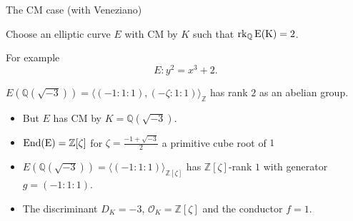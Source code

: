 \documentclass[12pt]{beamer}
\newcommand{\qe}{\mathbb{Q}}
\begin{document}
\begin{frame}{The CM case (with Veneziano)}
\begin{alertblock} {Choose an elliptic curve $E$  with CM by $K$ such that $\rm{rk}_\mathbb{Q} \, E({K})=2$.  }\end{alertblock}

 For example  $$E : y^2=x^3+2.$$ 
   
 \pause
  
  \begin{alertblock} {$E(\qe(\sqrt{-3}))=\langle (-1:1:1),(-\zeta:1:1)\rangle_{\mathbb{Z}}$ has rank $2$ as an abelian group. }\end{alertblock}
  
  
  
 \pause
 

    \begin{itemize} \item But $E$ has CM by $K=\qe(\sqrt{-3})$.
    \item  $\rm{End}
    (E)=\mathbb{Z}[\zeta]$ for $\zeta=\frac{-1+\sqrt{-3}}{2}$ a primitive cube root of $1$ 
    
    \item $E(\qe(\sqrt{-3}))=\langle (-1:1:1)\rangle_{\mathbb{Z}[\zeta]}$ has $\mathbb{Z}[\zeta]$-rank $1$ with generator  $g=(-1:1:1)$.
    



   \item   The  discriminant $D_K=-3$,  $\mathcal{O}_K=\mathbb{Z}[\zeta]$ and the conductor $f=1$.\end{itemize}
 \end{frame}
\end{document}
